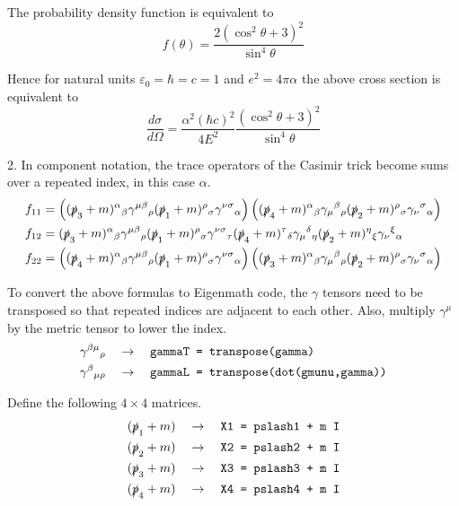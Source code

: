 \documentclass[12pt]{article}
\begin{document}
The probability density function is equivalent to
\begin{equation*}
f(\theta)=\frac{2(\cos^2\theta+3)^2}{\sin^4\theta}
\end{equation*}

Hence for natural units $\varepsilon_0=\hbar=c=1$ and $e^2=4\pi\alpha$ the above cross section is equivalent to
\begin{equation*}
\frac{d\sigma}{d\Omega}=\frac{\alpha^2(\hbar c)^2}{4E^2}
\frac{(\cos^2\theta+3)^2}{\sin^4\theta}
\end{equation*}

2. In component notation, the trace operators of the Casimir trick become sums over
a repeated index, in this case $\alpha$.
\begin{align*}
f_{11}&=
\left(
(\slashed{p}_3+m)^\alpha{}_\beta
\gamma^{\mu\beta}{}_\rho
(\slashed{p}_1+m)^\rho{}_\sigma
\gamma^{\nu\sigma}{}_\alpha
\right)
\left(
(\slashed{p}_4+m)^\alpha{}_\beta
\gamma_\mu{}^\beta{}_\rho
(\slashed{p}_2+m)^\rho{}_\sigma
\gamma_\nu{}^\sigma{}_\alpha
\right)
\\
f_{12}&=
(\slashed{p}_3+m)^\alpha{}_\beta
\gamma^{\mu\beta}{}_\rho
(\slashed{p}_1+m)^\rho{}_\sigma
\gamma^{\nu\sigma}{}_\tau
(\slashed{p}_4+m)^\tau{}_\delta
\gamma_\mu{}^\delta{}_\eta
(\slashed{p}_2+m)^\eta{}_\xi
\gamma_\nu{}^\xi{}_\alpha
\\
f_{22}&=
\left(
(\slashed{p}_4+m)^\alpha{}_\beta
\gamma^{\mu\beta}{}_\rho
(\slashed{p}_1+m)^\rho{}_\sigma
\gamma^{\nu\sigma}{}_\alpha
\right)
\left(
(\slashed{p}_3+m)^\alpha{}_\beta
\gamma_\mu{}^\beta{}_\rho
(\slashed{p}_2+m)^\rho{}_\sigma
\gamma_\nu{}^\sigma{}_\alpha
\right)
\end{align*}

To convert the above formulas to Eigenmath code,
the $\gamma$ tensors need to be transposed
so that repeated indices are adjacent to each other.
Also, multiply $\gamma^\mu$ by the metric tensor to lower the index.
\begin{align*}
\gamma^{\beta\mu}{}_\rho\quad&\rightarrow\quad
\text{\tt gammaT = transpose(gamma)}\\
\gamma^\beta{}_{\mu\rho}\quad&\rightarrow\quad
\text{\tt gammaL = transpose(dot(gmunu,gamma))}
\end{align*}

Define the following $4\times4$ matrices.
\begin{align*}
(\slashed{p}_1+m)\quad&\rightarrow\quad\text{\tt X1 = pslash1 + m I}\\
(\slashed{p}_2+m)\quad&\rightarrow\quad\text{\tt X2 = pslash2 + m I}\\
(\slashed{p}_3+m)\quad&\rightarrow\quad\text{\tt X3 = pslash3 + m I}\\
(\slashed{p}_4+m)\quad&\rightarrow\quad\text{\tt X4 = pslash4 + m I}
\end{align*}
\end{document}
